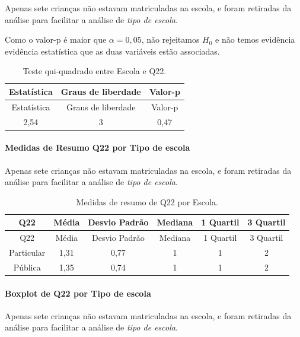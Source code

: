 \documentclass[]{article}
\let\oldparagraph\paragraph
\renewcommand{\paragraph}[1]{\oldparagraph{#1}\mbox{}}
\begin{document}
Apenas sete crianças não estavam matriculadas na escola, e foram retiradas da análise para facilitar a análise de \emph{tipo de escola}.

Como o valor-p é maior que \(\alpha=0,05\), não rejeitamos \(H_0\) e não temos evidência evidência estatística que as duas variáveis estão associadas.

\begin{longtable}[]{@{}ccc@{}}
\caption{\label{tab:unnamed-chunk-401}Teste qui-quadrado entre Escola e Q22.}\tabularnewline
\toprule
Estatística & Graus de liberdade & Valor-p\tabularnewline
\midrule
\endfirsthead
\toprule
Estatística & Graus de liberdade & Valor-p\tabularnewline
\midrule
\endhead
2,54 & 3 & 0,47\tabularnewline
\bottomrule
\end{longtable}

\cleardoublepage

\hypertarget{medidas-de-resumo-q22-por-tipo-de-escola}{%
\paragraph{Medidas de Resumo Q22 por Tipo de escola}\label{medidas-de-resumo-q22-por-tipo-de-escola}}

Apenas sete crianças não estavam matriculadas na escola, e foram retiradas da análise para facilitar a análise de \emph{tipo de escola}.

\begin{longtable}[]{@{}cccccc@{}}
\caption{\label{tab:unnamed-chunk-402}Medidas de resumo de Q22 por Escola.}\tabularnewline
\toprule
Q22 & Média & Desvio Padrão & Mediana & 1 Quartil & 3 Quartil\tabularnewline
\midrule
\endfirsthead
\toprule
Q22 & Média & Desvio Padrão & Mediana & 1 Quartil & 3 Quartil\tabularnewline
\midrule
\endhead
Particular & 1,31 & 0,77 & 1 & 1 & 2\tabularnewline
Pública & 1,35 & 0,74 & 1 & 1 & 2\tabularnewline
\bottomrule
\end{longtable}

\hypertarget{boxplot-de-q22-por-tipo-de-escola}{%
\paragraph{Boxplot de Q22 por Tipo de escola}\label{boxplot-de-q22-por-tipo-de-escola}}

Apenas sete crianças não estavam matriculadas na escola, e foram retiradas da análise para facilitar a análise de \emph{tipo de escola}.
\end{document}
